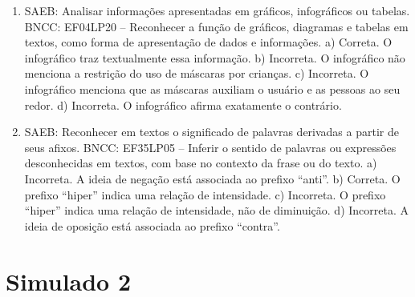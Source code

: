 \begin{enumerate}
\item
SAEB: Analisar informações apresentadas em gráficos, infográficos ou tabelas. BNCC: EF04LP20 -- Reconhecer a função de gráficos, diagramas e tabelas em textos, como forma de apresentação de dados e informações. a) Correta. O infográfico traz textualmente essa informação. b) Incorreta. O infográfico não menciona a restrição do uso de máscaras por crianças. c) Incorreta. O infográfico menciona que as máscaras auxiliam o usuário e as pessoas ao seu redor. d) Incorreta. O infográfico afirma exatamente o contrário.

\item
SAEB: Reconhecer em textos o significado de palavras derivadas a partir de seus afixos. BNCC: EF35LP05 -- Inferir o sentido de palavras ou expressões desconhecidas em textos, com base no contexto da frase ou do texto. a) Incorreta. A ideia de negação está associada ao prefixo ``anti''. b) Correta. O prefixo ``hiper'' indica uma relação de intensidade. c) Incorreta. O prefixo ``hiper'' indica uma relação de intensidade, não de diminuição. d) Incorreta. A ideia de oposição está associada ao prefixo ``contra''.
\end{enumerate}

\section*{Simulado 2}

